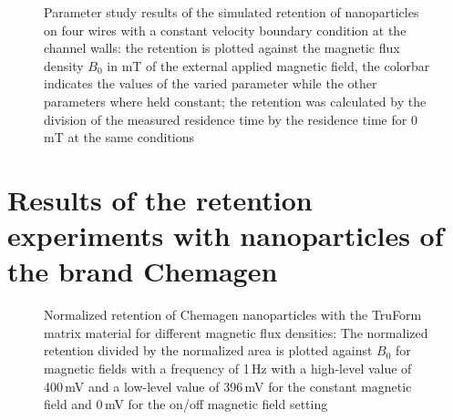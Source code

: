\begin{figure}[h]
          \caption[Parameter study results of the simulated retention of nanoparticles on four wires with a constant velocity boundary condition at the channel walls]{Parameter study results of the simulated retention of nanoparticles on four wires with a constant velocity boundary condition at the channel walls: the retention is plotted against the magnetic flux density $B_{0}$ in mT of the external applied magnetic field, the colorbar indicates the values of the varied parameter while the other parameters where held constant; the retention was calculated by the division of the measured residence time by the residence time for 0\,mT at the same conditions}
        \label{fig:fw_param_res_constBC}
  \end{figure}

\newpage
\section{Results of the retention experiments with nanoparticles of the brand Chemagen}
\FloatBarrier  
\begin{figure}[H]
        \centering
        \caption[Normalized retention of Chemagen nanoparticles with the TruForm matrix material for different magnetic flux densities]{Normalized retention of Chemagen nanoparticles with the TruForm matrix material for different magnetic flux densities: The normalized retention divided by the normalized area is plotted against $B_{0}$ for magnetic fields with a frequency of 1\,Hz with a high-level value of 400\,mV and a low-level value of 396\,mV for the constant magnetic field and 0\,mV for the on/off magnetic field setting}
        \label{fig:prax_norm_ret_all}
  \end{figure}
        

